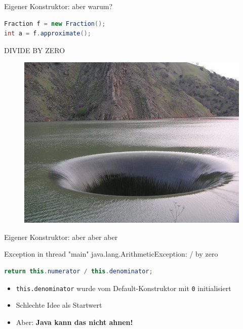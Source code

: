 \documentclass[18pt]{beamer}
\begin{document}
\begin{frame}[fragile]{Eigener Konstruktor: aber warum?}
    \begin{exampleblock}{}
        \begin{lstlisting}[language=Java]
Fraction f = new Fraction();
int a = f.approximate();
        \end{lstlisting}
    \end{exampleblock}
\end{frame}

\begin{frame}{DIVIDE BY ZERO}
    \begin{figure}
        \includegraphics[scale=.35]{img/dividebyzero.jpg}
    \end{figure}
\end{frame}

\begin{frame}[fragile]{Eigener Konstruktor: aber aber aber}
    \begin{alertblock}{}
        Exception in thread "main" java.lang.ArithmeticException: / by zero
    \end{alertblock}
    \begin{exampleblock}{}
        \begin{lstlisting}[language=Java]
return this.numerator / this.denominator;
        \end{lstlisting}
    \end{exampleblock}
    \begin{itemize}
        \item \alert{\texttt{this.denominator} wurde vom Default-Konstruktor mit \texttt{0} initialisiert}
        \item Schlechte Idee als Startwert
        \item Aber: \textbf{Java kann das nicht ahnen!}
    \end{itemize}
\end{frame}
\end{document}
